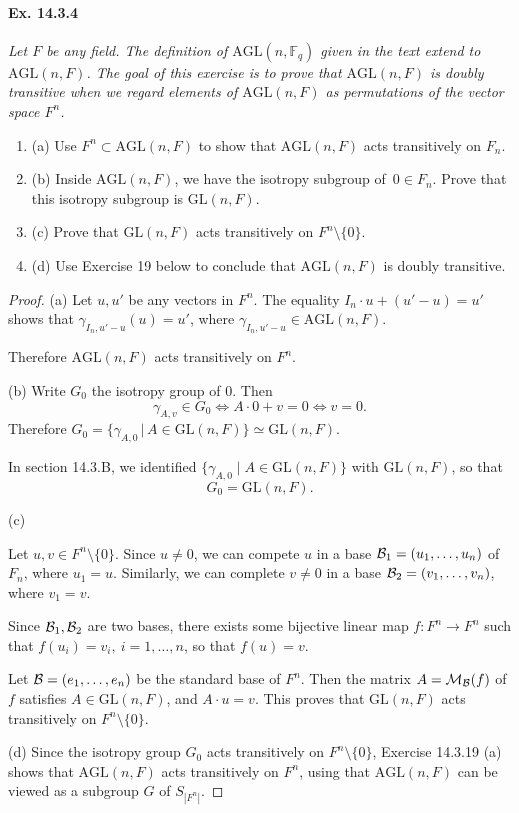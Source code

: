 \documentclass[11pt,a4paper]{article}
\newcommand{\be} {\begin{enumerate}}
\newcommand{\ee} {\end{enumerate}}
\newcommand{\F}{\mathbb{F}}
\begin{document}
\paragraph{Ex. 14.3.4}{\it Let $F$ be any field. The definition of $\mathrm{AGL}(n,\F_q)$ given in the text extend to $\mathrm{AGL}(n,F)$.
The goal of this exercise is to prove that $\mathrm{AGL}(n,F)$ is doubly transitive when we regard elements of $\mathrm{AGL}(n,F)$ as permutations of the vector space $F^n$.
\be
\item[(a)] Use $F^n \subset \mathrm{AGL}(n,F)$ to show that $\mathrm{AGL}(n,F)$ acts transitively on $F_n$.
\item[(b)] Inside $\mathrm{AGL}(n,F)$, we have the isotropy subgroup of $\,0\in F_n$. Prove that this isotropy subgroup is $\mathrm{GL}(n,F)$.
\item[(c)] Prove that $\mathrm{GL}(n,F)$ acts transitively on $F^n\setminus \{0\}$.
\item[(d)]Use Exercise 19 below to conclude that $\mathrm{AGL}(n,F)$ is doubly transitive.
\ee
}
\begin{proof}
\item[(a)] Let $u,u'$ be any vectors in $F^n$. The equality $I_n\cdot u  + (u'- u) = u'$ shows that $\gamma_{I_n,u'-u}(u) = u'$, where $\gamma_{I_n,u'-u} \in \mathrm{AGL}(n,F)$.

Therefore $\mathrm{AGL}(n,F)$ acts transitively on $F^n$.

\item[(b)] Write $G_0$ the isotropy group of $0$. Then
$$\gamma_{A,v} \in G_0 \iff A\cdot 0 + v = 0 \iff v = 0.$$
Therefore $G_0 = \{\gamma_{A,0}\, | \,  A \in \mathrm{GL}(n,F)\} \simeq \mathrm{GL}(n,F)$.

In section 14.3.B, we identified $\{\gamma_{A,0}\mid A \in \mathrm{GL}(n,F)\} $ with $\mathrm{GL}(n,F)$, so that
$$G_0 = \mathrm{GL}(n,F).$$

\item[(c)]

 Let $u,v \in F^n \setminus \{0\}$. Since $u \ne 0$, we can compete $u$ in a base ${\cal B} _1= (u_1,\ldots,u_n)$ of $F_n$, where $u_1 = u$. Similarly, we can complete $v\ne 0$ in a base ${\cal B}_2 = (v_1,\ldots,v_n)$, where $v_1 = v$. 

Since ${\cal B}_1,{\cal B}_2$ are two bases, there exists some bijective linear map $f : F^n \to F^n$ such that $f(u_i) = v_i,\ i=1,\ldots,n$, so that $f(u) = v$.

Let ${\cal B} = (e_1,\ldots,e_n)$ be the standard base of $F^n$. Then the matrix $A = {\cal M}_{\cal B}(f)$ of $f$ satisfies $A \in \mathrm{GL}(n,F)$, and $A \cdot u = v$. This proves that $\mathrm{GL}(n,F)$ acts transitively on $F^n \setminus\{0\}$.

\item[(d)] Since  the isotropy group $G_0$ acts transitively on $F^n\setminus \{0\}$, Exercise 14.3.19 (a) shows that $\mathrm{AGL}(n,F)$ acts transitively on $F^n$, using that  $\mathrm{AGL}(n,F)$ can be viewed as a subgroup $G$ of $S_{|F^n|}$.
\end{proof} 
 
\end{document}
